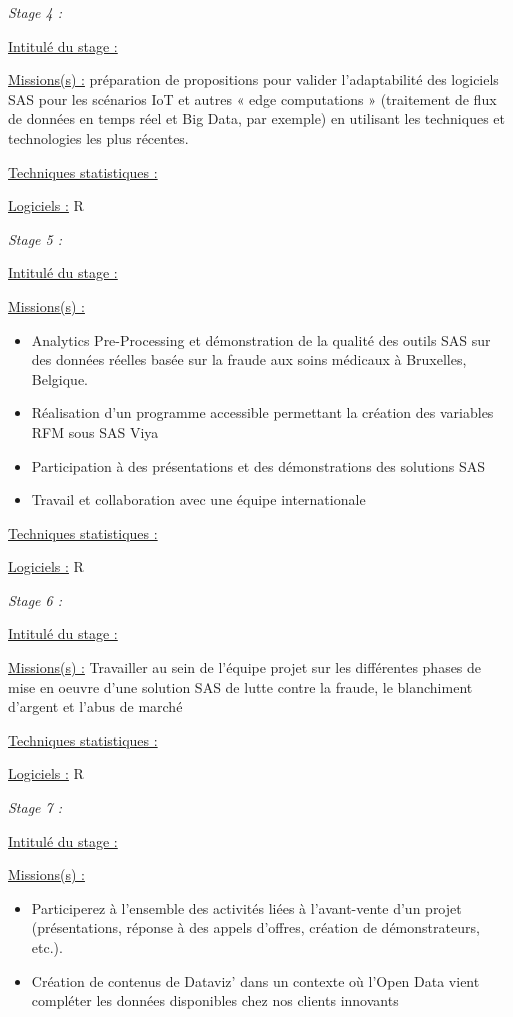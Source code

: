 \documentclass[
  letterpaper,
  DIV=11,
  numbers=noendperiod]{scrreprt}
\begin{document}
\emph{Stage 4 :}

\uline{Intitulé du stage :}

\uline{Missions(s) :} préparation de propositions pour valider
l'adaptabilité des logiciels SAS pour les scénarios IoT et autres « edge
computations » (traitement de flux de données en temps réel et Big Data,
par exemple) en utilisant les techniques et technologies les plus
récentes.

\uline{Techniques statistiques :}

\uline{Logiciels :} R

\emph{Stage 5 :}

\uline{Intitulé du stage :}

\uline{Missions(s) :}

\begin{itemize}
\item
  Analytics Pre-Processing et démonstration de la qualité des outils SAS
  sur des données réelles basée sur la fraude aux soins médicaux à
  Bruxelles, Belgique.
\item
  Réalisation d'un programme accessible permettant la création des
  variables RFM sous SAS Viya
\item
  Participation à des présentations et des démonstrations des solutions
  SAS
\item
  Travail et collaboration avec une équipe internationale
\end{itemize}

\uline{Techniques statistiques :}

\uline{Logiciels :} R

\emph{Stage 6 :}

\uline{Intitulé du stage :}

\uline{Missions(s) :} Travailler au sein de l'équipe projet sur les
différentes phases de mise en oeuvre d'une solution SAS de lutte contre
la fraude, le blanchiment d'argent et l'abus de marché

\uline{Techniques statistiques :}

\uline{Logiciels :} R

\emph{Stage 7 :}

\uline{Intitulé du stage :}

\uline{Missions(s) :}

\begin{itemize}
\item
  Participerez à l'ensemble des activités liées à l'avant-vente d'un
  projet (présentations, réponse à des appels d'offres, création de
  démonstrateurs, etc.).
\item
  Création de contenus de Dataviz' dans un contexte où l'Open Data vient
  compléter les données disponibles chez nos clients innovants
\end{itemize}
\end{document}
